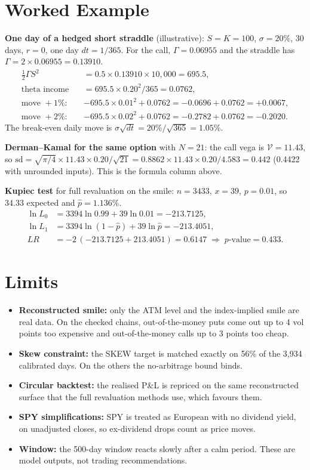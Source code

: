 \documentclass[11pt,a4paper]{article}
\begin{document}
\section{Worked Example}
\textbf{One day of a hedged short straddle} (illustrative): $S=K=100$, $\sigma=20\%$, 30 days, $r=0$, one day $dt=1/365$. For the call, $\Gamma=0.06955$ and the straddle has $\Gamma=2\times0.06955=0.13910$.
\begin{align*}
\tfrac12\Gamma S^2 &= 0.5\times0.13910\times10{,}000=695.5,\\
\text{theta income} &= 695.5\times0.20^2/365=0.0762,\\
\text{move }+1\%:\quad & -695.5\times0.01^2+0.0762=-0.0696+0.0762=+0.0067,\\
\text{move }+2\%:\quad & -695.5\times0.02^2+0.0762=-0.2782+0.0762=-0.2020.
\end{align*}
The break-even daily move is $\sigma\sqrt{dt}=20\%/\sqrt{365}=1.05\%$.

\textbf{Derman--Kamal for the same option} with $N=21$: the call vega is $\mathcal{V}=11.43$, so $\mathrm{sd}=\sqrt{\pi/4}\times11.43\times0.20/\sqrt{21}=0.8862\times11.43\times0.20/4.583=0.442$ (0.4422 with unrounded inputs). This is the formula column above.

\textbf{Kupiec test} for full revaluation on the smile: $n=3433$, $x=39$, $p=0.01$, so 34.33 expected and $\hat p=1.136\%$.
\begin{align*}
\ln L_0&=3394\ln0.99+39\ln0.01=-213.7125,\\
\ln L_1&=3394\ln(1-\hat p)+39\ln\hat p=-213.4051,\\
LR&=-2\,(-213.7125+213.4051)=0.6147\;\Rightarrow\;p\text{-value}=0.433.
\end{align*}

\section{Limits}
\begin{itemize}
\item \textbf{Reconstructed smile:} only the ATM level and the index-implied smile are real data. On the checked chains, out-of-the-money puts come out up to 4 vol points too expensive and out-of-the-money calls up to 3 points too cheap.
\item \textbf{Skew constraint:} the SKEW target is matched exactly on 56\% of the 3,934 calibrated days. On the others the no-arbitrage bound binds.
\item \textbf{Circular backtest:} the realised P\&L is repriced on the same reconstructed surface that the full revaluation methods use, which favours them.
\item \textbf{SPY simplifications:} SPY is treated as European with no dividend yield, on unadjusted closes, so ex-dividend drops count as price moves.
\item \textbf{Window:} the 500-day window reacts slowly after a calm period. These are model outputs, not trading recommendations.
\end{itemize}
\end{document}
